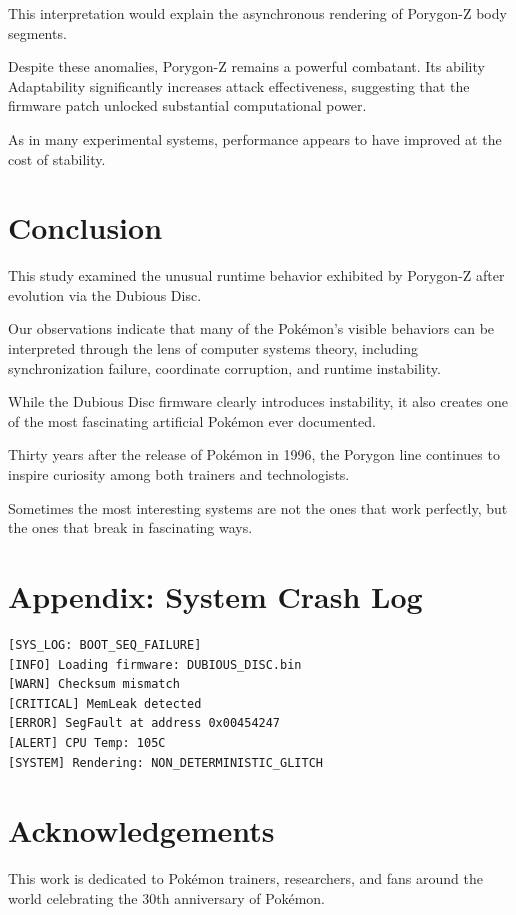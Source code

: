 \documentclass[conference]{IEEEtran}
\begin{document}
This interpretation would explain the asynchronous rendering of Porygon-Z body segments.

Despite these anomalies, Porygon-Z remains a powerful combatant. Its ability Adaptability significantly increases attack effectiveness, suggesting that the firmware patch unlocked substantial computational power.

As in many experimental systems, performance appears to have improved at the cost of stability.

\section{Conclusion}

This study examined the unusual runtime behavior exhibited by Porygon-Z after evolution via the Dubious Disc.

Our observations indicate that many of the Pokémon's visible behaviors can be interpreted through the lens of computer systems theory, including synchronization failure, coordinate corruption, and runtime instability.

While the Dubious Disc firmware clearly introduces instability, it also creates one of the most fascinating artificial Pokémon ever documented.

Thirty years after the release of Pokémon in 1996, the Porygon line continues to inspire curiosity among both trainers and technologists.

Sometimes the most interesting systems are not the ones that work perfectly, but the ones that break in fascinating ways.

\section*{Appendix: System Crash Log}

\begin{lstlisting}
[SYS_LOG: BOOT_SEQ_FAILURE]
[INFO] Loading firmware: DUBIOUS_DISC.bin
[WARN] Checksum mismatch
[CRITICAL] MemLeak detected
[ERROR] SegFault at address 0x00454247
[ALERT] CPU Temp: 105C
[SYSTEM] Rendering: NON_DETERMINISTIC_GLITCH
\end{lstlisting}

\section*{Acknowledgements}

This work is dedicated to Pokémon trainers, researchers, and fans around the world celebrating the 30th anniversary of Pokémon.
\end{document}

